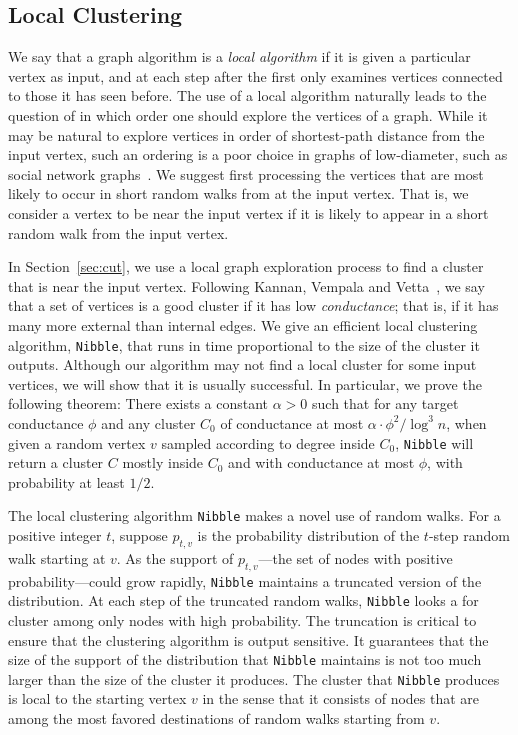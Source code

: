 \documentclass[11pt]{article}
\begin{document}
\subsection{Local Clustering}
We say that a graph algorithm is a \textit{local algorithm} if it is given
  a particular vertex as input,
  and at each step after the first only examines vertices connected to those
  it has seen before.
The use of a local algorithm naturally leads to the question of in which
  order one should explore the vertices of a graph.
While it may be natural to explore vertices in order of shortest-path
  distance from the input
  vertex, such an ordering is a poor choice in graphs of low-diameter,
  such as social network graphs~\cite{diameterSocialNetwork}.
We suggest first processing the vertices that are most likely
  to occur in short random walks from at the input vertex.
That is, we consider a vertex to be near the input vertex if it is likely
  to appear in a short random walk from the input vertex.

In Section~\ref{sec:cut}, we use a local graph exploration process
  to find a cluster that is near the input vertex.
Following Kannan, Vempala and Vetta~\cite{KannanVempalaVetta}, we say that
  a set of vertices is a good cluster if
  it has low \textit{conductance}; that is,
  if it has many more external than internal edges.
We give an efficient local clustering algorithm, \texttt{Nibble}, that
  runs in time proportional to the size of the cluster it outputs.
Although our algorithm may not find a local cluster
  for some input vertices,
  we will show that it is usually successful.
In particular, we prove the following theorem:
There exists a constant $\alpha > 0$ such that for any
   target conductance $\phi$ and any cluster $C_0$ 
   of conductance at most $\alpha\cdot\phi^2/\log^3 n$,
   when given a random vertex $v$  sampled according to degree
   inside $C_0$,
   \texttt{Nibble} will return a cluster $C$ mostly inside $C_0$  and with
  conductance at most $\phi$,
  with probability at least $1/2$.

The local clustering algorithm \texttt{Nibble} makes a novel use of random walks.
For a positive integer $t$, suppose $p_{t,v}$ is
  the probability distribution of the $t$-step
  random walk starting at $v$.
As the support of $p_{t,v}$---the set of nodes with positive probability---could
  grow rapidly, \texttt{Nibble} maintains a truncated version
  of the distribution.
At each step of the truncated random walks,
  \texttt{Nibble} looks a for cluster among only nodes
  with high probability.
The truncation is critical to ensure that
    the clustering algorithm is output sensitive.
It guarantees that the size of the support of the distribution that
  \texttt{Nibble}
  maintains is not too much larger than the size of the cluster it produces.
The cluster that \texttt{Nibble}  produces is local to the starting
  vertex $v$ in the sense that it consists of nodes that are among
  the most favored destinations of random walks starting from $v$.
\end{document}
